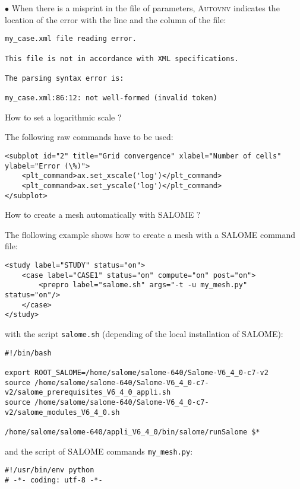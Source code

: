 \documentclass[a4paper,10pt,twoside]{csshortdoc}
\begin{document}
\begin{list}{$\bullet$}{}
When there is a misprint in the file of parameters,
\textsc{Autovnv} indicates the location of the error
with the line and the column of the file:
\small
\begin{verbatim}
my_case.xml file reading error.

This file is not in accordance with XML specifications.

The parsing syntax error is:

my_case.xml:86:12: not well-formed (invalid token)
\end{verbatim}
\normalsize

\item How to set a logarithmic scale ?

The following raw commands have to be used:

\small
\begin{verbatim}
<subplot id="2" title="Grid convergence" xlabel="Number of cells" ylabel="Error (\%)">
    <plt_command>ax.set_xscale('log')</plt_command>
    <plt_command>ax.set_yscale('log')</plt_command>
</subplot>
\end{verbatim}
\normalsize

\item How to create a mesh automatically with SALOME ?

The flollowing example shows how to create a mesh with a SALOME command file:
\small
\begin{verbatim}
<study label="STUDY" status="on">
    <case label="CASE1" status="on" compute="on" post="on">
        <prepro label="salome.sh" args="-t -u my_mesh.py" status="on"/>
    </case>
</study>
\end{verbatim}
\normalsize

with the script \texttt{salome.sh} (depending of the local installation of
SALOME):
\small
\begin{verbatim}
#!/bin/bash

export ROOT_SALOME=/home/salome/salome-640/Salome-V6_4_0-c7-v2
source /home/salome/salome-640/Salome-V6_4_0-c7-v2/salome_prerequisites_V6_4_0_appli.sh
source /home/salome/salome-640/Salome-V6_4_0-c7-v2/salome_modules_V6_4_0.sh

/home/salome/salome-640/appli_V6_4_0/bin/salome/runSalome $*
\end{verbatim}
\normalsize

and the script of SALOME commands \texttt{my\_mesh.py}:
\small
\begin{verbatim}
#!/usr/bin/env python
# -*- coding: utf-8 -*-


\end{verbatim}
\end{list}
\end{document}
